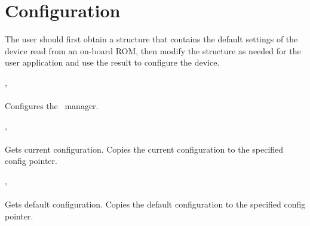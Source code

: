 	
	

	

	\section{Configuration}
		The user should first obtain a structure that contains the default settings of the device read from an on-board ROM, 
		then modify the structure as needed for the user application and use the result to configure the device.\par


		\deviceconfig, \\ \\
		Configures the \deviceName\ manager.\par

		\deviceconfig, \\ \\
		Gets current configuration. Copies the current configuration to the specified config pointer.\par

		\deviceconfig, \\ \\
		Gets default configuration. Copies the default configuration to the specified config pointer.\par


	



	
